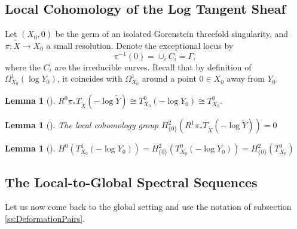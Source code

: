 \documentclass[11pt]{article}
\newtheorem{lem}[thm]{Lemma}
\theoremstyle{definition}
\newcommand{\push}{\pi_*}             %
\begin{document}
\subsection{Local Cohomology of the Log Tangent Sheaf}
Let $(X_0,0)$ be the germ of an isolated Gorenstein threefold singularity, and $\pi:\tilde{X}\to X_0$ a small resolution. Denote the exceptional locus by 
$$\pi^{-1}(0)=\cup_i C_i=\Gamma,$$
where the $C_i$ are the irreducible curves. 
Recall that by definition of $\Omega_{X_0}^1(\log Y_0)$, it coincides with $\Omega_{X_0}^1$ around a point $0\in X_0$ away from $Y_0$.
\begin{lem}[{\cite[Lemma 3.1]{F86}}]\label{lem:log_tangent_pushforward} $R^0\push T_{\tilde{X}}(-\log \tilde{Y})\cong T^0_{X_0}(-\log Y_0)\cong T_{X_0}^0 .$
\end{lem}

\begin{lem}[{\cite[Lemma 3.2]{F86}}] \label{lem:log_higher_direct_images}
The local cohomology group $H^2_{\{0\}}(R^1\push T_{\tilde{X}}(-\log \tilde{Y}))=0$
\end{lem}

\begin{lem}[{\cite[Lemma 3.3]{F86}}]\label{lem:Schlessinger} $H^0(T_{X_0}^1(-\log Y_0))=H^2_{\{0\}}(T_{X_0}^0(-\log Y_0))=H^2_{\{0\}}(T_{X_0}^0) $  
\end{lem}

\subsection{The Local-to-Global Spectral Sequences}
Let us now come back to the global setting and use the notation of subsection \ref{ss:DeformationPairs}.
\end{document}
